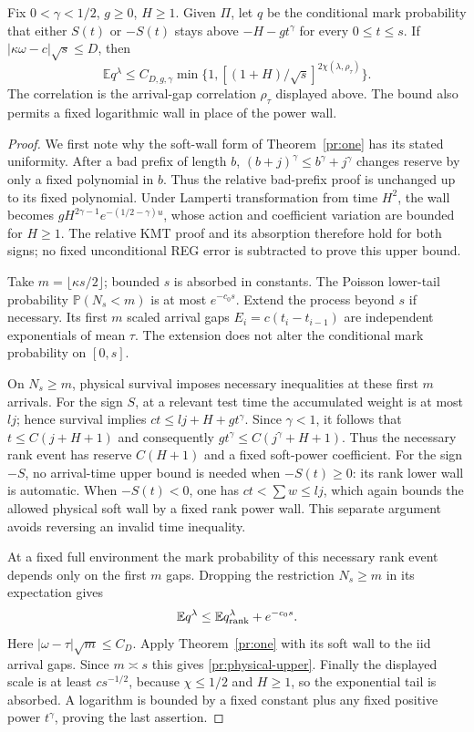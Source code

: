 \begin{theorem}\label{pr:physical-one}
Fix $0<\gamma<1/2$, $g\ge0$, $H\ge1$. Given $\Pi$, let $q$ be the
conditional mark probability that either $S(t)$ or $-S(t)$ stays above
$-H-gt^\gamma$ for every $0\le t\le s$. If
$|\kappa\omega-c|\sqrt s\le D$, then
\begin{equation}
 \mathbb E q^\lambda\le C_{D,g,\gamma}
       \min\{1,[(1+H)/\sqrt s]^{2\chi(\lambda,\rho_\tau)}\}.
 \label{pr:physical-upper}
\end{equation}
The correlation is the arrival-gap correlation $\rho_\tau$ displayed
above. The bound also permits a fixed logarithmic wall in place of
the power wall.
\end{theorem}
\begin{proof}
We first note why the soft-wall form of Theorem~\ref{pr:one} has its
stated uniformity. After a bad prefix of length $b$,
$(b+j)^\gamma\le b^\gamma+j^\gamma$ changes reserve by only a fixed
polynomial in $b$. Thus the relative bad-prefix proof is unchanged up
to its fixed polynomial. Under Lamperti transformation from time $H^2$,
the wall becomes $gH^{2\gamma-1}e^{-(1/2-\gamma)u}$, whose action and
coefficient variation are bounded for $H\ge1$. The relative KMT proof
and its absorption therefore hold for both signs; no fixed unconditional
REG error is subtracted to prove this upper bound.

Take $m=\lfloor\kappa s/2\rfloor$; bounded $s$ is absorbed in constants.
The Poisson lower-tail probability $\mathbb P(N_s<m)$ is at most
$e^{-c_0s}$. Extend the process beyond $s$ if necessary. Its first $m$
scaled arrival gaps $E_i=c(t_i-t_{i-1})$ are independent exponentials
of mean $\tau$. The extension does not alter the conditional mark
probability on $[0,s]$.

On $N_s\ge m$, physical survival imposes necessary inequalities at these
first $m$ arrivals. For the sign $S$, at a relevant test time the
accumulated weight is at most $lj$; hence survival implies
$ct\le lj+H+gt^\gamma$. Since $\gamma<1$, it follows that
$t\le C(j+H+1)$ and consequently
$gt^\gamma\le C(j^\gamma+H+1)$. Thus the necessary rank event has reserve
$C(H+1)$ and a fixed soft-power coefficient. For the sign $-S$, no
arrival-time upper bound is needed when $-S(t)\ge0$: its rank lower
wall is automatic. When $-S(t)<0$, one has $ct<\sum w\le lj$, which
again bounds the allowed physical soft wall by a fixed rank power wall.
This separate argument avoids reversing an invalid time inequality.

At a fixed full environment the mark probability of this necessary rank
event depends only on the first $m$ gaps. Dropping the restriction
$N_s\ge m$ in its expectation gives
\[
 \mathbb E q^\lambda\le\mathbb E q_{\rm rank}^\lambda+e^{-c_0s}.
\]
Here $|\omega-\tau|\sqrt m\le C_D$. Apply Theorem~\ref{pr:one} with
its soft wall to the iid arrival gaps. Since $m\asymp s$ this gives
\eqref{pr:physical-upper}. Finally the displayed scale is at least
$cs^{-1/2}$, because $\chi\le1/2$ and $H\ge1$, so the exponential tail
is absorbed. A logarithm is bounded by a fixed constant plus any fixed
positive power $t^\gamma$, proving the last assertion.
\end{proof}

